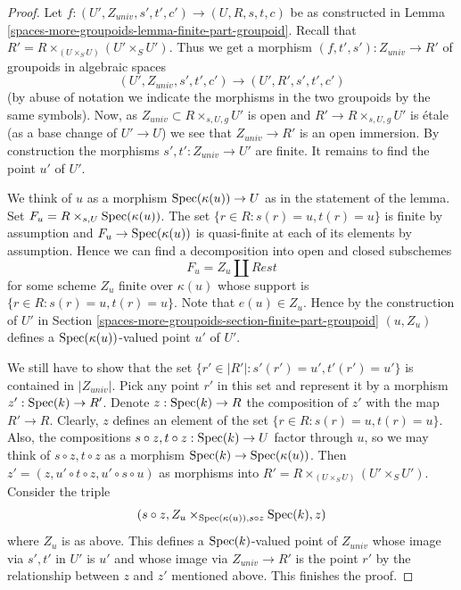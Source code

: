 \begin{proof}
Let $f : (U', Z_{univ}, s', t', c') \to (U, R, s, t, c)$ be as constructed in
Lemma \ref{spaces-more-groupoids-lemma-finite-part-groupoid}.
Recall that $R' = R \times_{(U \times_S U)} (U' \times_S U')$.
Thus we get a morphism $(f, t', s') : Z_{univ} \to R'$ of groupoids
in algebraic spaces
$$
(U', Z_{univ}, s', t', c') \to (U', R', s', t', c')
$$
(by abuse of notation we indicate the morphisms in the two groupoids
by the same symbols). Now, as $Z_{univ} \subset R \times_{s, U, g} U'$ is open
and $R' \to R \times_{s, U, g} U'$ is \'etale (as a base change
of $U' \to U$) we see that $Z_{univ} \to R'$ is an open immersion.
By construction the morphisms $s', t' : Z_{univ} \to U'$ are finite.
It remains to find the point $u'$ of $U'$.

\medskip\noindent
We think of $u$ as a morphism $\operatorname{Spec}(\kappa(u)) \to U$ as in
the statement of the lemma. Set $F_u = R \times_{s, U} \operatorname{Spec}(\kappa(u))$.
The set $\{r \in R : s(r) = u, t(r) = u\}$ is finite by assumption
and $F_u \to \operatorname{Spec}(\kappa(u))$ is quasi-finite at each
of its elements by assumption. Hence we can find a decomposition into
open and closed subschemes
$$
F_u = Z_u \amalg Rest
$$
for some scheme $Z_u$ finite over $\kappa(u)$ whose support is
$\{r \in R : s(r) = u, t(r) = u\}$. Note that $e(u) \in Z_u$.
Hence by the construction of $U'$ in
Section \ref{spaces-more-groupoids-section-finite-part-groupoid}
$(u, Z_u)$ defines a $\operatorname{Spec}(\kappa(u))$-valued
point $u'$ of $U'$.

\medskip\noindent
We still have to show that the set
$\{r' \in |R'| : s'(r') = u', t'(r') = u'\}$
is contained in $|Z_{univ}|$.
Pick any point $r'$ in this set and represent it by a morphism
$z' : \operatorname{Spec}(k) \to R'$. Denote $z : \operatorname{Spec}(k) \to R$
the composition of $z'$ with the map $R' \to R$.
Clearly, $z$ defines an element of the set
$\{r \in R : s(r) = u, t(r) = u\}$.
Also, the compositions $s \circ z, t \circ z : \operatorname{Spec}(k) \to U$
factor through $u$, so we may think of $s \circ z, t \circ z$
as a morphism $\operatorname{Spec}(k) \to \operatorname{Spec}(\kappa(u))$. Then
$z' = (z, u' \circ t \circ z, u'\circ s \circ u)$ as morphisms into
$R' = R \times_{(U \times_S U)} (U' \times_S U')$.
Consider the triple
$$
(s \circ z, Z_u \times_{\operatorname{Spec}(\kappa(u)), s \circ z} \operatorname{Spec}(k), z)
$$
where $Z_u$ is as above. This defines a $\operatorname{Spec}(k)$-valued point
of $Z_{univ}$ whose image via $s', t'$ in $U'$ is $u'$ and
whose image via
$Z_{univ} \to R'$ is the point $r'$ by the relationship between
$z$ and $z'$ mentioned above.
This finishes the proof.
\end{proof}

